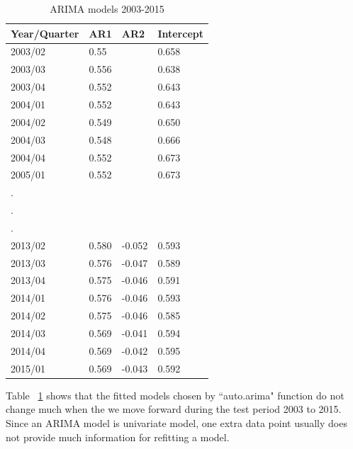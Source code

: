 \begin{table}[ht]
	\centering
	\begin{tabular}{@{}llll@{}}
		\toprule
		Year/Quarter & AR1     & AR2     & Intercept       \\ \midrule
		2003/02    & 0.55&  & 0.658  \\
		2003/03    & 0.556 &  & 0.638   \\ 
		2003/04    & 0.552 &  & 0.643  \\
		2004/01    & 0.552 &  & 0.643  \\
		2004/02    & 0.549 &  & 0.650  \\
		2004/03    & 0.548 & & 0.666  \\
		2004/04    & 0.552 & & 0.673  \\
		2005/01    & 0.552 & & 0.673  \\
		.\\
		.\\
		.\\
		2013/02    & 0.580 & -0.052 &  0.593 \\
		2013/03    & 0.576 & -0.047 &  0.589 \\
		2013/04    & 0.575 & -0.046 &  0.591  \\
		2014/01    & 0.576 & -0.046 &  0.593 \\
		2014/02    & 0.575 & -0.046 &  0.585 \\
		2014/03    & 0.569 & -0.041 &  0.594 \\
		2014/04    & 0.569 & -0.042 &  0.595 \\
		2015/01    & 0.569 & -0.043 &  0.592 \\
		 \bottomrule
	\end{tabular}
	\caption{ARIMA models 2003-2015}
	\label{ARIMAmodels}
\end{table}


Table ~\ref{ARIMAmodels} shows that the fitted models chosen by ``auto.arima" function do not change much when the we move forward during the test period 2003 to 2015. Since an ARIMA model is univariate model, one extra data point usually does not provide much information for refitting a model.




  

